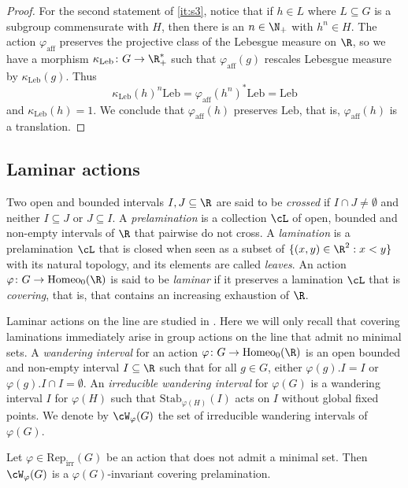 \documentclass[reqno]{amsart}
\begin{document}
\begin{proof}
For the second statement of \eqref{it:s3}, notice that if $h \in L$ where $L \subseteq G$ is a subgroup commensurate with $H$, then there is an $n \in \N_+$ with $h^n \in H$. The action $\varphi_\mathrm{aff}$ preserves the projective class of the Lebesgue measure on $\R$, so we have a morphism $\kappa_\mathrm{Leb} \colon G \to \R^\ast_+$ such that $\varphi_\mathrm{aff}(g)$ rescales Lebesgue measure by $\kappa_\mathrm{Leb}(g)$. Thus
\[
        \kappa_\mathrm{Leb}(h)^n \mathrm{Leb} = \varphi_\mathrm{aff}(h^n)^\ast \mathrm{Leb} = \mathrm{Leb}
\]
and $\kappa_\mathrm{Leb}(h) = 1$. We conclude that $\varphi_\mathrm{aff}(h)$ preserves $\mathrm{Leb}$, that is, $\varphi_\mathrm{aff}(h)$ is a translation.
\end{proof}

\subsection{Laminar actions}\label{subsection:laminar}
Two open and bounded intervals $I,J \subseteq \R$ are said to be \emph{crossed} if $I \cap J \neq \emptyset$ and neither $I \subseteq J$ or $J \subseteq I$. A \emph{prelamination} is a collection $\cL$ of open, bounded and non-empty intervals of $\R$ that pairwise do not cross. A \emph{lamination} is a prelamination $\cL$ that is closed when seen as a subset of $\{(x,y) \in \R^2 : x < y\}$ with its natural topology, and its elements are called \emph{leaves}. An action $\varphi \colon G \to \mathrm{Homeo}_0(\R)$ is said to be \emph{laminar} if it preserves a lamination $\cL$ that is \emph{covering}, that is, that contains an increasing exhaustion of $\R$.

Laminar actions on the line are studied in \cite{BMRT}. Here we will only recall that covering laminations immediately arise in group actions on the line that admit no minimal sets. A \emph{wandering interval} for an action $\varphi \colon G \to \mathrm{Homeo}_0(\R)$ is an open bounded and non-empty interval $I \subseteq \R$ such that for all $g \in G$, either $\varphi(g).I = I$ or $\varphi(g).I \cap I = \emptyset$. An \emph{irreducible wandering interval} for $\varphi(G)$ is a wandering interval $I$ for $\varphi(H)$ such that $\mathrm{Stab}_{\varphi(H)}(I)$ acts on $I$ without global fixed points. We denote by $\cW_\varphi(G)$ the set of irreducible wandering intervals of $\varphi(G)$.

\begin{lema} \label{lema:wandering}
Let $\varphi \in \mathrm{Rep}_\mathrm{irr}(G)$ be an action that does not admit a minimal set. Then $\cW_\varphi(G)$ is a $\varphi(G)$-invariant covering prelamination.
\end{lema}
\end{document}
